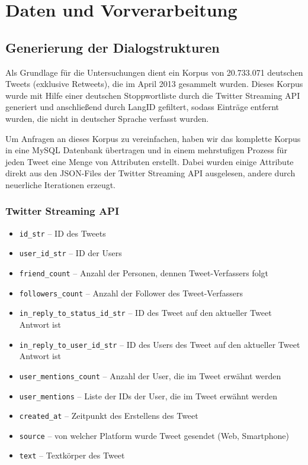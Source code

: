 \documentclass[main.tex]{subfiles}
\begin{document}
\section{Daten und Vorverarbeitung}



\subsection{Generierung der Dialogstrukturen}
Als Grundlage für die Untersuchungen dient ein Korpus von 20.733.071 deutschen Tweets (exklusive Retweets), die im April 2013 gesammelt wurden. Dieses Korpus wurde mit Hilfe einer deutschen Stoppwortliste durch die Twitter Streaming API generiert und anschließend durch LangID gefiltert, sodass Einträge entfernt wurden, die nicht in deutscher Sprache verfasst wurden.


Um Anfragen an dieses Korpus zu vereinfachen, haben wir das komplette Korpus in eine MySQL Datenbank übertragen und in einem mehrstufigen Prozess für jeden Tweet eine Menge von Attributen erstellt. Dabei wurden einige Attribute direkt aus den JSON-Files der Twitter Streaming API ausgelesen, andere durch neuerliche Iterationen erzeugt.

\subsubsection*{Twitter Streaming API}

\begin{itemize}
\item \texttt{id\_str} -- ID des Tweets 
\item \texttt{user\_id\_str} -- ID der Users
\item \texttt{friend\_count} -- Anzahl der Personen, dennen Tweet-Verfassers folgt
\item \texttt{followers\_count} -- Anzahl der Follower des Tweet-Verfassers
\item \texttt{in\_reply\_to\_status\_id\_str} -- ID des Tweet auf den aktueller Tweet Antwort ist
\item \texttt{in\_reply\_to\_user\_id\_str} -- ID des Users des Tweet auf den aktueller Tweet Antwort ist
\item \texttt{user\_mentions\_count} -- Anzahl der User, die im Tweet erwähnt werden
\item \texttt{user\_mentions} -- Liste der IDs der User, die im Tweet erwähnt werden
\item \texttt{created\_at} -- Zeitpunkt des Erstellens des Tweet
\item \texttt{source} -- von welcher Platform wurde Tweet gesendet (Web, Smartphone)
\item \texttt{text} -- Textkörper des Tweet
\end{itemize}
\end{document}
